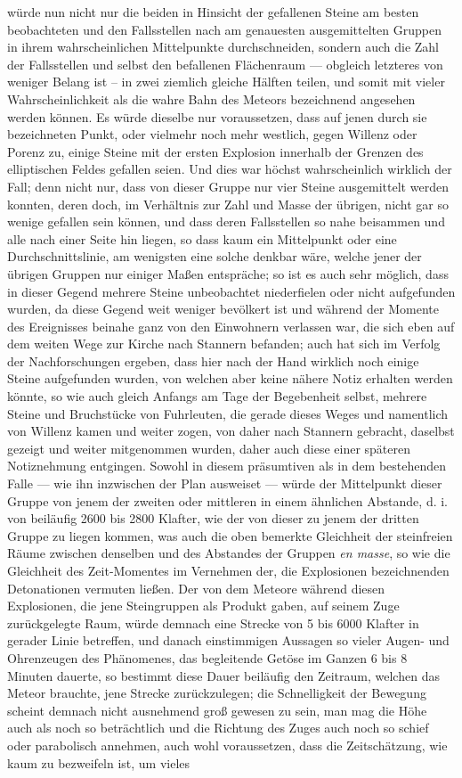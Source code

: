 \documentclass[a4paper, 11pt, oneside, german]{article}
\begin{document}
würde nun nicht nur die beiden in Hinsicht der gefallenen Steine am besten beobachteten und den Fallsstellen nach am genauesten ausgemittelten Gruppen in ihrem wahrscheinlichen Mittelpunkte durchschneiden, sondern auch die Zahl der Fallsstellen und selbst den befallenen Flächenraum --- obgleich letzteres von weniger Belang ist -- in zwei ziemlich gleiche Hälften teilen, und somit mit vieler Wahrscheinlichkeit als die wahre Bahn des Meteors bezeichnend angesehen werden können. Es würde dieselbe nur voraussetzen, dass auf jenen durch sie bezeichneten Punkt, oder vielmehr noch mehr westlich, gegen Willenz oder Porenz zu, einige Steine mit der ersten Explosion innerhalb der Grenzen des elliptischen Feldes gefallen seien. Und dies war höchst wahrscheinlich wirklich der Fall; denn nicht nur, dass von dieser Gruppe nur vier Steine ausgemittelt werden konnten, deren doch, im Verhältnis zur Zahl und Masse der übrigen, nicht gar so wenige gefallen sein können, und dass deren Fallsstellen so nahe beisammen und alle nach einer Seite hin liegen, so dass kaum ein Mittelpunkt oder eine Durchschnittslinie, am wenigsten eine solche denkbar wäre, welche jener der übrigen Gruppen nur einiger Maßen entspräche; so ist es auch sehr möglich, dass in dieser Gegend mehrere Steine unbeobachtet niederfielen oder nicht aufgefunden wurden, da diese Gegend weit weniger bevölkert ist und während der Momente des Ereignisses beinahe ganz von den Einwohnern verlassen war, die sich eben auf dem weiten Wege zur Kirche nach Stannern befanden; auch hat sich im Verfolg der Nachforschungen ergeben, dass hier nach der Hand wirklich noch einige Steine aufgefunden wurden, von welchen aber keine nähere Notiz erhalten werden könnte, so wie auch gleich Anfangs am Tage der Begebenheit selbst, mehrere Steine und Bruchstücke von Fuhrleuten, die gerade dieses Weges und namentlich von Willenz kamen und weiter zogen, von daher nach Stannern gebracht, daselbst gezeigt und weiter mitgenommen wurden, daher auch diese einer späteren Notiznehmung entgingen. Sowohl in diesem präsumtiven als in dem bestehenden Falle --- wie ihn inzwischen der Plan ausweiset --- würde der Mittelpunkt dieser Gruppe von jenem der zweiten oder mittleren in einem ähnlichen Abstande, d. i. von beiläufig 2600 bis 2800 Klafter, wie der von dieser zu jenem der dritten Gruppe zu liegen kommen, was auch die oben bemerkte Gleichheit der steinfreien Räume zwischen denselben und des Abstandes der Gruppen \emph{en masse}, so wie die Gleichheit des Zeit-Momentes im Vernehmen der, die Explosionen bezeichnenden Detonationen vermuten ließen. Der von dem Meteore während diesen Explosionen, die jene Steingruppen als Produkt gaben, auf seinem Zuge zurückgelegte Raum, würde demnach eine Strecke von 5 bis 6000 Klafter in gerader Linie betreffen, und danach einstimmigen Aussagen so vieler Augen- und Ohrenzeugen des Phänomenes, das begleitende Getöse im Ganzen 6 bis 8 Minuten dauerte, so bestimmt diese Dauer beiläufig den Zeitraum, welchen das Meteor brauchte, jene Strecke zurückzulegen; die Schnelligkeit der Bewegung scheint demnach nicht ausnehmend groß gewesen zu sein, man mag die Höhe auch als noch so beträchtlich und die Richtung des Zuges auch noch so schief oder parabolisch annehmen, auch wohl voraussetzen, dass die Zeitschätzung, wie kaum zu bezweifeln ist, um vieles 
\end{document}
